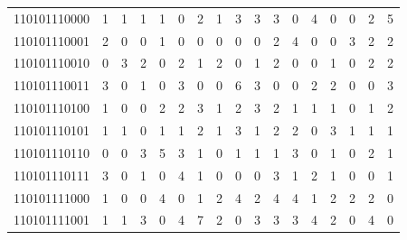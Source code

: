 \documentclass[10pt,a4paper]{article}
\begin{document}
\begin{longtable}{ |c|c|c|c|c|c|c|c|c|c|c|c|c|c|c|c|c| }
    110101110000              & 1                            & 1                                & 1                            & 1                              & 0   & 2   & 1   & 3   & 3   & 3   & 0   & 4   & 0   & 0   & 2   & 5   \\
    110101110001              & 2                            & 0                                & 0                            & 1                              & 0   & 0   & 0   & 0   & 0   & 2   & 4   & 0   & 0   & 3   & 2   & 2   \\
    110101110010              & 0                            & 3                                & 2                            & 0                              & 2   & 1   & 2   & 0   & 1   & 2   & 0   & 0   & 1   & 0   & 2   & 2   \\
    110101110011              & 3                            & 0                                & 1                            & 0                              & 3   & 0   & 0   & 6   & 3   & 0   & 0   & 2   & 2   & 0   & 0   & 3   \\
    110101110100              & 1                            & 0                                & 0                            & 2                              & 2   & 3   & 1   & 2   & 3   & 2   & 1   & 1   & 1   & 0   & 1   & 2   \\
    110101110101              & 1                            & 1                                & 0                            & 1                              & 1   & 2   & 1   & 3   & 1   & 2   & 2   & 0   & 3   & 1   & 1   & 1   \\
    110101110110              & 0                            & 0                                & 3                            & 5                              & 3   & 1   & 0   & 1   & 1   & 1   & 3   & 0   & 1   & 0   & 2   & 1   \\
    110101110111              & 3                            & 0                                & 1                            & 0                              & 4   & 1   & 0   & 0   & 0   & 3   & 1   & 2   & 1   & 0   & 0   & 1   \\
    110101111000              & 1                            & 0                                & 0                            & 4                              & 0   & 1   & 2   & 4   & 2   & 4   & 4   & 1   & 2   & 2   & 2   & 0   \\
    110101111001              & 1                            & 1                                & 3                            & 0                              & 4   & 7   & 2   & 0   & 3   & 3   & 3   & 4   & 2   & 0   & 4   & 0   \\

\end{longtable}
\end{document}
